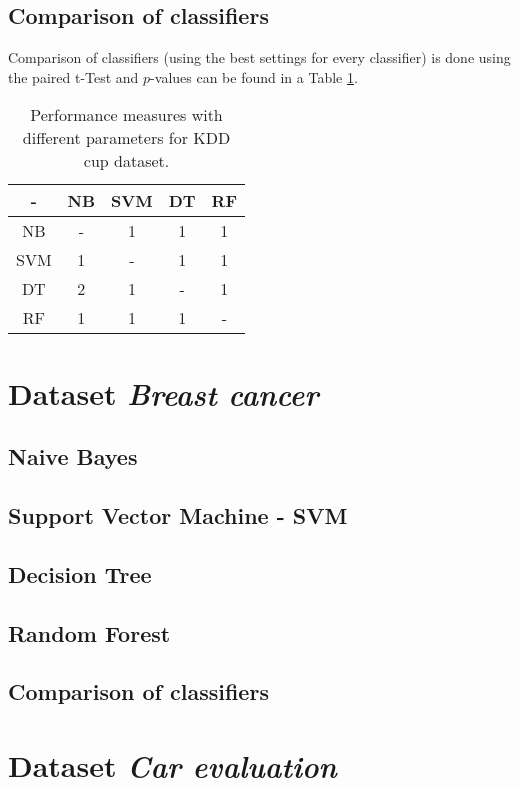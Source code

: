 \documentclass[11pt,a4paper,titlepage]{article}
\begin{document}
\subsection{Comparison of classifiers}
Comparison of classifiers (using the best settings for every classifier) is done using the paired t-Test and $p$-values can be found in a Table \ref{table:comparisonKDD}.


  \begin{table}
  \centering
  \begin{tabular}{| c | c | c | c | c |}
    \hline
     		-	   & NB 	  & 	SVM 	& DT		 & RF \\ \hline
    NB 			   &  - 	  &     1		& 		1	 & 	1 		\\ \hline
    SVM 		   & 	1	  & 	- 		& 		1	 &	1 		\\ \hline
    DT 			   & 	2	  & 	1		& 		-	 &	1		\\ \hline
    RF 			   &  1       & 	1		& 		1	 &	-			\\
    \hline
  \end{tabular}
  \caption{Performance measures with different parameters for KDD cup dataset.}
  \label{table:comparisonKDD}
  \end{table}




\section{Dataset \textit{Breast cancer}}

\subsection{Naive Bayes}
\subsection{Support Vector Machine - SVM}
\subsection{Decision Tree}
\subsection{Random Forest}
\subsection{Comparison of classifiers}

\section{Dataset \textit{Car evaluation}}
\end{document}
